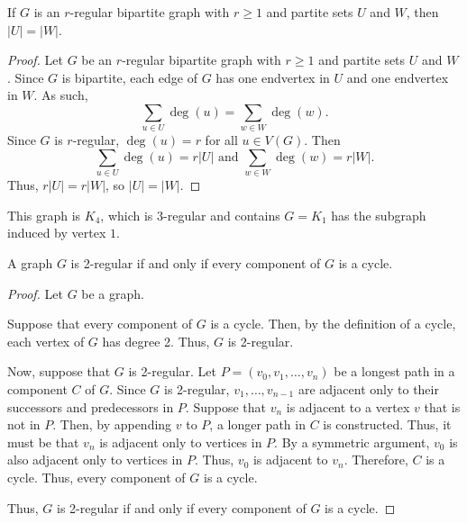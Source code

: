 \documentclass[12pt]{article}
\begin{document}
 If $G$ is an $r$-regular bipartite graph with $r\geq 1$ and partite sets $U$ and $W$, then $|U| = |W|$.
\begin{proof}
Let $G$ be an $r$-regular bipartite graph with $r\geq 1$ and partite sets $U$ and $W$. Since $G$ is bipartite, each edge of $G$ has one endvertex in $U$ and one endvertex in $W$. As such, $$
\sum_{u\in U}\deg(u) = \sum_{w\in W}\deg(w).
$$
Since $G$ is $r$-regular, $\deg(u) = r$ for all $u \in V(G)$. Then
$$
\sum_{u\in U}\deg(u) = r|U|\text{  and  }\sum_{w\in W}\deg(w) = r|W|.
$$
Thus, $r|U| = r|W|$, so $|U| = |W|.$
\end{proof}
\bigskip{}
 This graph is $K_4$, which is $3$-regular and contains $G=K_1$ has the subgraph induced by vertex $1$.
\begin{center}
\end{center}
\newpage


 A graph $G$ is 2-regular if and only if every component of $G$ is a cycle.
\begin{proof}
    Let $G$ be a graph.

    Suppose that every component of $G$ is a cycle.
    Then, by the definition of a cycle, each vertex of $G$ has degree 2.
    Thus, $G$ is 2-regular.

    Now, suppose that $G$ is 2-regular.
    Let $P = (v_0, v_1, \hdots, v_n)$ be a longest path in a component $C$ of $G$.
    Since $G$ is 2-regular, $v_1, \hdots, v_{n-1}$ are adjacent only to their successors and predecessors in $P$.
    Suppose that $v_n$ is adjacent to a vertex $v$ that is not in $P$.
    Then, by appending $v$ to $P$, a longer path in $C$ is constructed.
    Thus, it must be that $v_n$ is adjacent only to vertices in $P$.
    By a symmetric argument, $v_0$ is also adjacent only to vertices in $P$.
    Thus, $v_0$ is adjacent to $v_n$.
    Therefore, $C$ is a cycle.
    Thus, every component of $G$ is a cycle.

    Thus, $G$ is 2-regular if and only if every component of $G$ is a cycle.
\end{proof}
\end{document}
